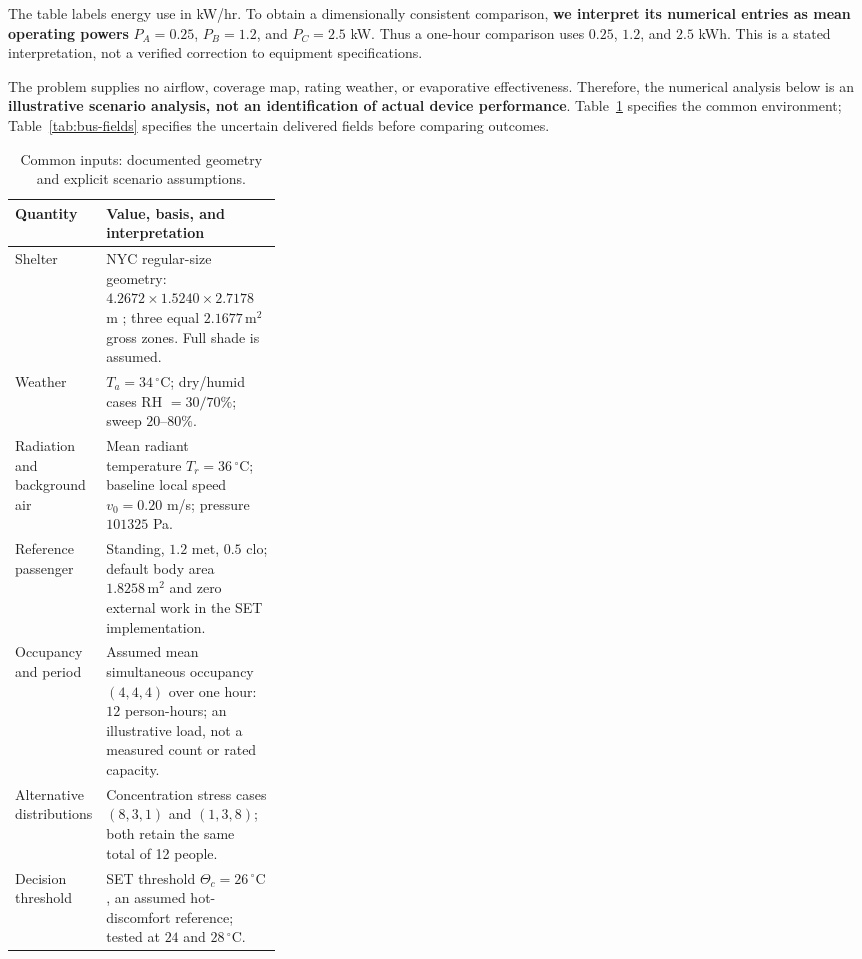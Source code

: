 \documentclass[12pt]{article}
\begin{document}
The table labels energy use in kW/hr. To obtain a dimensionally consistent comparison, \textbf{we interpret its numerical entries as mean operating powers} $P_A=0.25$, $P_B=1.2$, and $P_C=2.5$ kW. Thus a one-hour comparison uses $0.25$, $1.2$, and $2.5$ kWh. This is a stated interpretation, not a verified correction to equipment specifications.

The problem supplies no airflow, coverage map, rating weather, or evaporative effectiveness. Therefore, the numerical analysis below is an \textbf{illustrative scenario analysis, not an identification of actual device performance}. Table~\ref{tab:bus-assumptions} specifies the common environment; Table~\ref{tab:bus-fields} specifies the uncertain delivered fields before comparing outcomes.

\begin{table}[!ht]
\centering\small
\caption{Common inputs: documented geometry and explicit scenario assumptions.}
\label{tab:bus-assumptions}
\renewcommand{\arraystretch}{1.12}
\begin{tabularx}{\linewidth}{@{}p{0.31\linewidth}X@{}}
\toprule
Quantity & Value, basis, and interpretation\\
\midrule
Shelter & NYC regular-size geometry: $4.2672\times1.5240\times2.7178$ m \cite{nycshelter}; three equal $2.1677\,\mathrm{m^2}$ gross zones. Full shade is assumed.\\
Weather & $T_a=34\,^{\circ}\mathrm C$; dry/humid cases RH $=30/70\%$; sweep $20$--$80\%$.\\
Radiation and background air & Mean radiant temperature $T_r=36\,^{\circ}\mathrm C$; baseline local speed $v_0=0.20$ m/s; pressure $101325$ Pa.\\
Reference passenger & Standing, $1.2$ met, $0.5$ clo; default body area $1.8258\,\mathrm{m^2}$ and zero external work in the SET implementation.\\
Occupancy and period & Assumed mean simultaneous occupancy $(4,4,4)$ over one hour: $12$ person-hours; an illustrative load, not a measured count or rated capacity.\\
Alternative distributions & Concentration stress cases $(8,3,1)$ and $(1,3,8)$; both retain the same total of 12 people.\\
Decision threshold & SET threshold $\Theta_c=26\,^{\circ}\mathrm C$, an assumed hot-discomfort reference; tested at $24$ and $28\,^{\circ}\mathrm C$.\\
\bottomrule
\end{tabularx}
\end{table}
\end{document}

